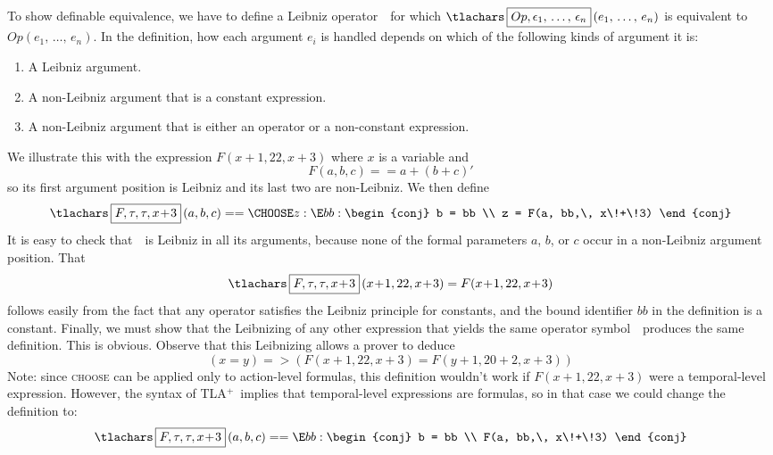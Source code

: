 \documentclass[11pt,fleqn]{article}
\newcommand{\tlaplus}{TLA$^{+}$}
\newcommand{\B}{\begingroup\tlachars\BB}
\newcommand{\BB}[1]{\endgroup\,\fbox{\rule{0pt}{.7em}%
\let\tlacolon\midcolon\ensuremath{#1}}\,}
\newcommand{\oneto}[2]{\ensuremath{#1_{1},\,\ldots,\,#1_{#2}}}
\begin{document}
\begin{sloppypar}
To show definable equivalence, we have to define a Leibniz operator
\B{Op,\oneto{\epsilon}{n}} for which
$\B{Op,\oneto{\epsilon}{n}}(\oneto{e}{n})$ is equivalent to
$Op(\oneto{e}{n})$.  In the definition, how each argument $e_{i}$
is handled depends on which of the following kinds of argument it is:
\end{sloppypar}
\begin{enumerate}
\item A Leibniz argument.

\item A non-Leibniz argument that is a constant expression.

\item A non-Leibniz argument that is either an operator or a non-constant
      expression.
\end{enumerate}
We illustrate this with the expression $F(x\!+\!1, 22, x\!+\!3)$ where
$x$ is a variable and 
 \[ F(a, b, c) == a + (b + c)'\]
so its first argument position is Leibniz and its last two are
non-Leibniz.  We then define
  \[  \B{F,\tau, \tau, x\!+\!3}(a, b, c) == 
      \CHOOSE z : \E bb : \begin{conj}
                          b = bb \\ z = F(a, bb,\, x\!+\!3)
                          \end{conj}
  \]
It is easy to check that \B{F,\tau, \tau, x\!+\!3} is Leibniz in all its
arguments, because none of the formal parameters $a$, $b$, or $c$ occur
in a non-Leibniz argument position.  That
 \[ \B{F,\tau, \tau, x\!+\!3}(x\!+\!1, 22, x\!+\!3) = F(x\!+\!1, 22, x\!+\!3)
 \]
follows easily from the fact that any operator satisfies the Leibniz
principle for constants, and the bound identifier $bb$ in the
definition is a constant.  Finally, we must show that the Leibnizing
of any other expression that yields the same operator symbol
\B{F,\tau, \tau, x\!+\!3} produces the same definition.  This is
obvious.
Observe that this Leibnizing allows a prover to deduce
  \[ (x=y) => (F(x\!+\!1, 22, x\!+\!3) = F(y\!+\!1, 20\!+\!2, x\!+\!3))
 \]
Note: since \textsc{choose} can be applied only to action-level
formulas, this definition wouldn't work if $F(x\!+\!1, 22, x\!+\!3)$
were a temporal-level expression.  However, the syntax of \tlaplus\
implies that temporal-level expressions are formulas, so in that
case we could change the definition to:
  \[  \B{F,\tau, \tau, x\!+\!3}(a, b, c) == 
      \E bb : \begin{conj}
                          b = bb \\ F(a, bb,\, x\!+\!3)
                          \end{conj}
  \]
\end{document}
